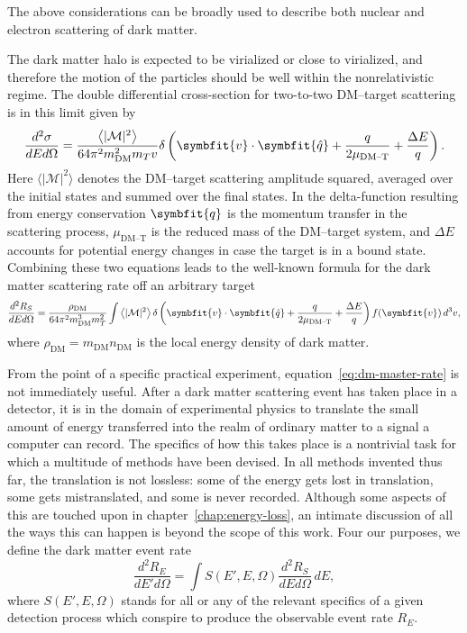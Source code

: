 \documentclass[b5paper, 10pt, twoside]{book}
\renewcommand{\vec}[1]{\symbfit{#1}}
\newcommand{\ddder}[3]{\frac{d^2#1}{d#2d#3}}
\newcommand{\unitv}[1]{\symbfit{\hat{#1}}}
\newcommand{\difd}{\,d}
\newcommand{\mean}[1]{\left\langle#1\right\rangle}
\newcommand{\tmean}[1]{\langle#1\rangle}
\begin{document}
The above considerations can be broadly used to describe both nuclear and electron scattering of dark matter.

The dark matter halo is expected to be virialized or close to virialized, and therefore the motion of the particles should be well within the nonrelativistic regime. The double differential cross-section for two-to-two DM--target scattering is in this limit given by
\begin{equation}
\ddder{\sigma}{E}{\Omega}=\frac{\mean{|\mathcal{M}|^2}}{64\pi^2m_\text{DM}^2m_Tv}\delta\left(\vec{v}\cdot\unitv{q}+\frac{q}{2\mu_\text{DM--T}}+\frac{\Delta E}{q}\right).
\end{equation}
Here $\tmean{|\mathcal{M}|^2}$ denotes the DM--target scattering amplitude squared, averaged over the initial states and summed over the final states. In the delta-function resulting from energy conservation $\vec{q}$ is the momentum transfer in the scattering process, $\mu_\text{DM--T}$ is the reduced mass of the DM--target system, and $\Delta E$ accounts for potential energy changes in case the target is in a bound state. Combining these two equations leads to the well-known formula for the dark matter scattering rate off an arbitrary target
\begin{equation}
\ddder{R_S}{E}{\Omega}=\frac{\rho_\text{DM}}{64\pi^2m_\text{DM}^3m_T^2}\int\mean{|\mathcal{M}|^2}\delta\left(\vec{v}\cdot\unitv{q}+\frac{q}{2\mu_\text{DM--T}}+\frac{\Delta E}{q}\right)f(\vec{v})\difd^3{v},
\label{eq:dm-master-rate}
\end{equation}
where $\rho_\text{DM}=m_\text{DM}n_\text{DM}$ is the local energy density of dark matter.

From the point of a specific practical experiment, equation~\eqref{eq:dm-master-rate} is not immediately useful. After a dark matter scattering event has taken place in a detector, it is in the domain of experimental physics to translate the small amount of energy transferred into the realm of ordinary matter to a signal a computer can record. The specifics of how this takes place is a nontrivial task for which a multitude of methods have been devised. In all methods invented thus far, the translation is not lossless: some of the energy gets lost in translation, some gets mistranslated, and some is never recorded. Although some aspects of this are touched upon in chapter~\ref{chap:energy-loss}, an intimate discussion of all the ways this can happen is beyond the scope of this work. Four our purposes, we define the dark matter event rate
\begin{equation}
\ddder{R_E}{E'}{\Omega}=\int S(E',E,\Omega)\ddder{R_S}{E}{\Omega}\difd E,
\label{eq:dm-event-rate}
\end{equation}
where $S(E',E,\Omega)$ stands for all or any of the relevant specifics of a given detection process which conspire to produce the observable event rate $R_E$.
\end{document}
